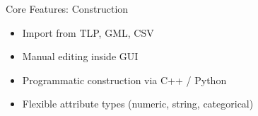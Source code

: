 \begin{frame}{Core Features: Construction}
	\begin{itemize}
		\item Import from TLP, GML, CSV
		\item Manual editing inside GUI
		\item Programmatic construction via C++ / Python
		\item Flexible attribute types (numeric, string, categorical)
	\end{itemize}
\end{frame}